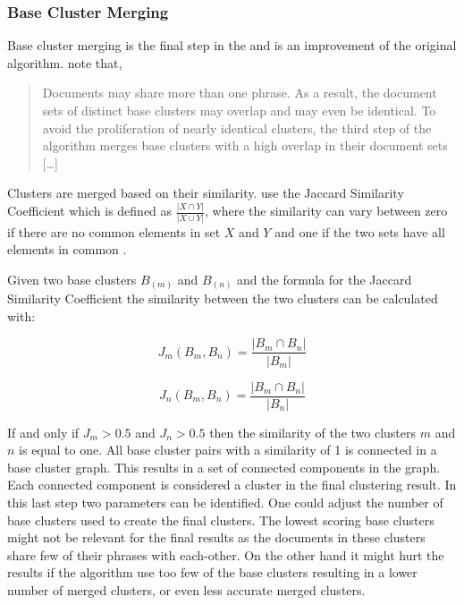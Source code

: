 \subsubsection{Base Cluster Merging}
Base cluster merging is the final step in the \STC and is an improvement of the original algorithm. \citeauthor{Oren1998} note that,
\begin{quote}
Documents may share more than one phrase. As a result, the document sets of distinct base clusters may overlap and may even be identical. To avoid the proliferation of nearly identical clusters, the third step of the algorithm merges base clusters with a high overlap in their document sets [\dots] \cite[][3]{Oren1998}
\end{quote}
Clusters are merged based on their similarity. \citeauthor{Oren1998} use the Jaccard Similarity Coefficient which is defined as 
\begin{math}
\frac{\vert X \cap Y \vert} {\vert X \cup Y \vert}
\end{math},
where the similarity can vary between zero if there are no common elements in set \(X\) and \(Y\) and one if the two sets have all elements in common \cite{VanRijsbergen1979}.

Given two base clusters \(B_(m)\) and \(B_(n)\) and the formula for the Jaccard Similarity Coefficient the similarity between the two clusters can be calculated with:

\begin{displaymath} 
J_{m}(B_{m},B_{n}) = 
\frac{\vert B_{m} \cap B_{n} \vert} {\vert B_{m} \vert}
\end{displaymath}

\begin{displaymath} 
J_{n}(B_{m},B_{n}) = 
\frac{\vert B_{m} \cap B_{n} \vert} {\vert B_{n} \vert}
\end{displaymath}

If and only if \(J_{m} > 0.5\) and \(J_{n} > 0.5 \) then the similarity of the two clusters \(m\) and \(n\) is equal to one. All base cluster pairs with a similarity of 1 is connected in a base cluster graph. This results in a set of connected components in the graph. Each connected component is considered a cluster in the final clustering result. In this last step two parameters can be identified. One could adjust the number of base clusters used to create the final clusters. The lowest scoring base clusters might not be relevant for the final results as the documents in these clusters share few of their phrases with each-other. On the other hand it might hurt the results if the algorithm use too few of the base clusters resulting in a lower number of merged clusters, or even less accurate merged clusters.

